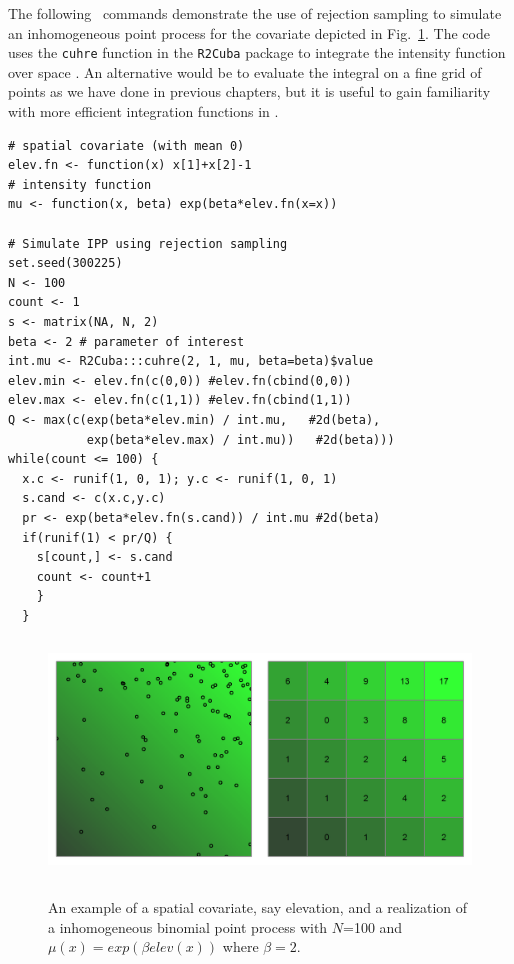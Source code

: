 The following \R~commands demonstrate the use of rejection sampling to
simulate an inhomogeneous point process for the covariate depicted in
Fig.~\ref{ch9.fig.hetero}. The code uses the \verb+cuhre+ function in
the {\tt R2Cuba} package to integrate the intensity function over
space \citep{hahn_etal:2011}. An alternative would be to evaluate the
integral on a fine grid of points as we have done in previous
chapters, but it is useful to gain familiarity with more efficient
integration functions in \R.

\begin{small}
\begin{verbatim}
# spatial covariate (with mean 0)
elev.fn <- function(x) x[1]+x[2]-1
# intensity function
mu <- function(x, beta) exp(beta*elev.fn(x=x))

# Simulate IPP using rejection sampling
set.seed(300225)
N <- 100
count <- 1
s <- matrix(NA, N, 2)
beta <- 2 # parameter of interest
int.mu <- R2Cuba:::cuhre(2, 1, mu, beta=beta)$value
elev.min <- elev.fn(c(0,0)) #elev.fn(cbind(0,0))
elev.max <- elev.fn(c(1,1)) #elev.fn(cbind(1,1))
Q <- max(c(exp(beta*elev.min) / int.mu,   #2d(beta),
           exp(beta*elev.max) / int.mu))   #2d(beta)))
while(count <= 100) {
  x.c <- runif(1, 0, 1); y.c <- runif(1, 0, 1)
  s.cand <- c(x.c,y.c)
  pr <- exp(beta*elev.fn(s.cand)) / int.mu #2d(beta)
  if(runif(1) < pr/Q) {
    s[count,] <- s.cand
    count <- count+1
    }
  }
\end{verbatim}
\end{small}


\begin{figure}
\centering
\includegraphics[width=5in,height=2.5in]{Ch11/figs/heteroPlots}
\label{ch9.fig.hetero}
\caption{An example of a spatial covariate, say elevation, and a
  realization of a inhomogeneous binomial point process with $N$=100
  and $\mu(x) = exp(\beta elev(x))$ where $\beta=2$.}
\end{figure}

